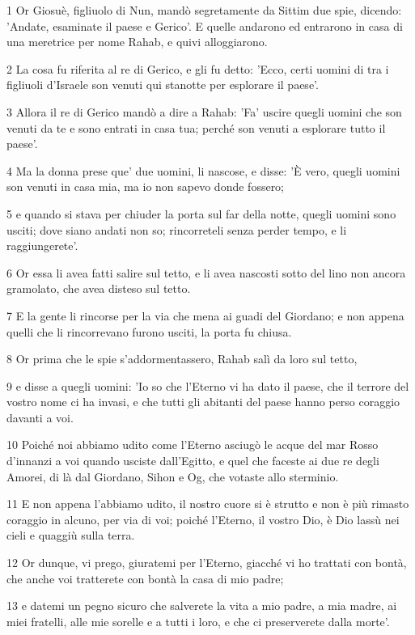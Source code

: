 \par 1 Or Giosuè, figliuolo di Nun, mandò segretamente da Sittim due spie, dicendo: 'Andate, esaminate il paese e Gerico'. E quelle andarono ed entrarono in casa di una meretrice per nome Rahab, e quivi alloggiarono.
\par 2 La cosa fu riferita al re di Gerico, e gli fu detto: 'Ecco, certi uomini di tra i figliuoli d'Israele son venuti qui stanotte per esplorare il paese'.
\par 3 Allora il re di Gerico mandò a dire a Rahab: 'Fa' uscire quegli uomini che son venuti da te e sono entrati in casa tua; perché son venuti a esplorare tutto il paese'.
\par 4 Ma la donna prese que' due uomini, li nascose, e disse: 'È vero, quegli uomini son venuti in casa mia, ma io non sapevo donde fossero;
\par 5 e quando si stava per chiuder la porta sul far della notte, quegli uomini sono usciti; dove siano andati non so; rincorreteli senza perder tempo, e li raggiungerete'.
\par 6 Or essa li avea fatti salire sul tetto, e li avea nascosti sotto del lino non ancora gramolato, che avea disteso sul tetto.
\par 7 E la gente li rincorse per la via che mena ai guadi del Giordano; e non appena quelli che li rincorrevano furono usciti, la porta fu chiusa.
\par 8 Or prima che le spie s'addormentassero, Rahab salì da loro sul tetto,
\par 9 e disse a quegli uomini: 'Io so che l'Eterno vi ha dato il paese, che il terrore del vostro nome ci ha invasi, e che tutti gli abitanti del paese hanno perso coraggio davanti a voi.
\par 10 Poiché noi abbiamo udito come l'Eterno asciugò le acque del mar Rosso d'innanzi a voi quando usciste dall'Egitto, e quel che faceste ai due re degli Amorei, di là dal Giordano, Sihon e Og, che votaste allo sterminio.
\par 11 E non appena l'abbiamo udito, il nostro cuore si è strutto e non è più rimasto coraggio in alcuno, per via di voi; poiché l'Eterno, il vostro Dio, è Dio lassù nei cieli e quaggiù sulla terra.
\par 12 Or dunque, vi prego, giuratemi per l'Eterno, giacché vi ho trattati con bontà, che anche voi tratterete con bontà la casa di mio padre;
\par 13 e datemi un pegno sicuro che salverete la vita a mio padre, a mia madre, ai miei fratelli, alle mie sorelle e a tutti i loro, e che ci preserverete dalla morte'.
